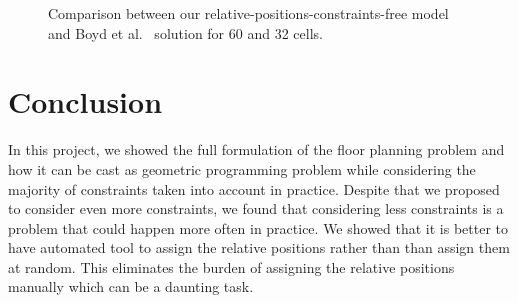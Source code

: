 \documentclass[12pt] {article}
\begin{document}
\begin{figure}[!tbh]
\centering        
   \caption{Comparison between our relative-positions-constraints-free model and Boyd et al.~\citep{boyd2004convex} solution for 60 and 32 cells.}
   \label{fig:comp}
\end{figure}



\section{Conclusion}
In this project, we showed the full formulation of the floor planning problem and how it can be cast as geometric programming problem while considering the majority of constraints taken into account in practice. Despite that we proposed to consider even more constraints, we found that considering less constraints is a problem that could happen more often in practice. We showed that it is better to have automated tool to assign the relative positions rather than than assign them at random. This eliminates the burden of assigning the relative positions manually which can be a daunting task. 


\end{document}

